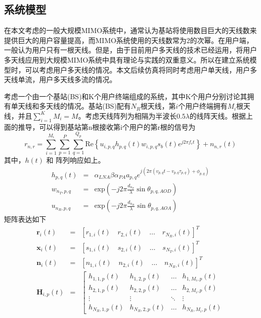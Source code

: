 \documentclass[bachelor,nocolorlinks, printoneside]{seuthesis} %
\begin{document}
\begin{Main}
\section{系统模型}
在本文考虑的一般大规模MIMO系统中，通常认为基站将使用数目巨大的天线数来提供巨大的用户容量提高，而MIMO系统使用的天线数常为2的次幂。在用户端，一般认为用户只有一根天线。但是，由于目前用户多天线的技术已经运用，将用户多天线应用到大规模MIMO系统中具有理论与实践的双重意义。所以在建立系统模型时，可以考虑用户多天线的情况。本文后续仿真将同时考虑用户单天线，用户多天线单流，用户多天线多流的情况。

考虑一个由一个基站(BS)和K个用户终端组成的系统，其中K个用户分别讨论其拥有单天线和多天线的情况。基站(BS)配有$N_R$根天线，第$i$个用户终端拥有$M_i$根天线，并且$\sum_{i=1}^K M_i = M$。考虑天线阵列为相隔为半波长$0.5\lambda$的线阵天线。根据上面的推导，可以得到基站第n根接收第i个用户的第r根的信号为
\begin{equation}\label{key}
r_{n,r} = \sum^{M_i}_{i=1} \sum_{p=1}^{P} \sum_{q=1}^{Q_p} \mathrm{Re} \left \lbrace u_{i,p,q} h_{p,q} (t) w_{i,p,q} s_b(t) e^{j 2\pi f_c t} \right \rbrace + n_{n,r}(t)
\end{equation}
其中，$h(t)$ 和 阵列响应如上。
\begin{eqnarray}\label{key}
h_{p,q}(t) &=& \alpha_{LNA}\beta\alpha_{PA}a_{p,q}e^{j(2\pi 
	(v_{p,q}t-v_{p,q}\tau_{p,q})+\phi_{p,q}
	)} \\
w_{n_{T},p,q} &=& \mathrm{exp}(-j2\pi \frac{d_{n_{T}}}{\lambda}\sin \theta_{p,q,AOD})\\
u_{n_{R},p,q} &=& \mathrm{exp}(-j2\pi \frac{d_{n_{R}}}{\lambda}\sin \theta_{p,q,AOA})
\end{eqnarray}
矩阵表达如下
\begin{eqnarray}\label{key}
\mathbf{r}_{i}(t) & = &[r_{1,i}(t) \quad r_{2,i}(t) \quad\dots\quad r_{N_{R},i}(t)]^{T} \\
\mathbf{x}_{i}(t)& = &[s_{1,i}(t) \quad s_{2,i}(t) \quad\dots\quad s_{N_{T},i}(t)]^{T} \\
\mathbf{n}_{i}(t)& = &[n_{1,i}(t) \quad n_{2,i}(t) \quad\dots\quad n_{N_{R},i}(t)]^{T} \\
\mathbf{H}_{i,p}(t)& = &\left[ \begin{array}{cccc}
h_{1,1,p}(t) & h_{1,2,p}(t) & \ldots & h_{1,M_{i},p}(t) \\
h_{2,1,p}(t) & h_{2,2,p}(t) & \ldots & h_{2,M_{i},p}(t) \\
\vdots & \vdots & \ddots & \vdots \\
h_{N_{R},1,p}(t) & h_{N_{R},2,p}(t) & \ldots & h_{N_{R},M_{i},p}(t)

\end{array}
\end{eqnarray}
\end{Main}
\end{document}
